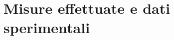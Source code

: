 \chapter{Misure effettuate e dati sperimentali}
\label{conclusioni}
\thispagestyle{empty}

\noindent %